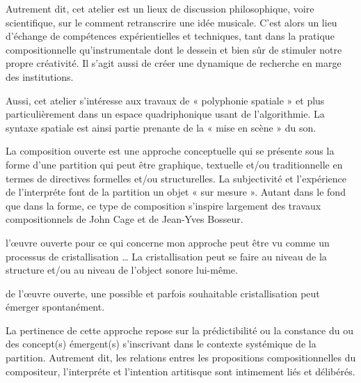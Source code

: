 \documentclass{article}
\begin{document}
Autrement dit, cet atelier est un lieux de discussion philosophique, voire scientifique, sur le comment retranscrire une idée musicale. C'est alors un lieu d'échange de compétences expérientielles et techniques, tant dans la pratique compositionnelle qu'instrumentale dont le dessein et bien sûr de stimuler notre propre créativité. Il s'agit aussi de créer une dynamique de recherche en marge des institutions.


Aussi, cet atelier s’intéresse aux travaux de « polyphonie spatiale » et plus particulièrement dans un espace quadriphonique usant de l'algorithmie.
La syntaxe spatiale est ainsi partie prenante de la « mise en scène » du son.

La composition ouverte est une approche conceptuelle qui se présente sous la forme d’une partition qui peut être graphique, textuelle et/ou traditionnelle en termes de directives formelles et/ou structurelles. La subjectivité et l’expérience de l’interpréte font de la partition un objet « sur mesure ». Autant dans le fond que dans la forme, ce type de composition s’inspire largement des travaux compositionnels de John Cage et de Jean-Yves Bosseur.


l’œuvre ouverte pour ce qui concerne mon approche peut être vu comme un processus de cristallisation …
La cristallisation peut se faire au niveau de la structure et/ou au niveau de l'object sonore lui-même.

de l’œuvre ouverte, une possible et parfois souhaitable cristallisation peut émerger spontanément.

La pertinence de cette approche repose sur la prédictibilité ou la constance du ou des concept(s) émergent(s) s’inscrivant dans le contexte systémique de la partition. Autrement dit, les relations entres les propositions compositionnelles du compositeur, l’interpréte et l’intention artitisque sont intimement liés et délibérés.


\end{document}
